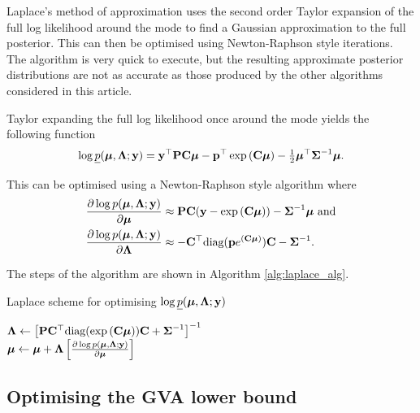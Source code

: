\documentclass{article}[12pt]
\begin{document}
Laplace's method of approximation uses the second order Taylor expansion of the full log likelihood around the
mode to find a Gaussian approximation to the full posterior. This can then be optimised using Newton-Raphson
style iterations. The algorithm is very quick to execute, but the resulting approximate posterior
distributions are not as accurate as those produced by the other algorithms considered in this article.


Taylor expanding the full log likelihood once around the mode yields the following function
\begin{align*}
\log \underline{p}({\boldsymbol \mu}, {\boldsymbol \Lambda}; {\bf y}) = {\bf y}^\top{\bf P}{\bf C}{\boldsymbol\mu} - {\bf p}^\top\exp \left ({\bf C} {\boldsymbol \mu} \right ) - {\tfrac{1}{2}} {\boldsymbol \mu}^\top {\boldsymbol\Sigma}^{-1} {\boldsymbol \mu}.
\end{align*}

This can be optimised using a Newton-Raphson style algorithm where
\begin{align*}
\frac{\partial \log p({\boldsymbol \mu}, {\boldsymbol \Lambda}; {\bf y})}{\partial {\boldsymbol\mu}} &\approx {\bf P} {\bf C} ({\bf y} - \exp{({\bf C}{\boldsymbol\mu})}) - {\boldsymbol \Sigma}^{-1} {\boldsymbol \mu} \text{ and} \\
\frac{\partial \log p({\boldsymbol \mu}, {\boldsymbol \Lambda}; {\bf y})}{\partial {\boldsymbol\Lambda}} &\approx - {\bf C}^\top \text{diag}({\bf p} e^{({\bf C} {\boldsymbol \mu})}) {\bf C} - {\boldsymbol \Sigma}^{-1}.
\end{align*}

The steps of the algorithm are shown in Algorithm \ref{alg:laplace_alg}.

\begin{algorithm}
\caption{Laplace scheme for optimising $\log \underline{p}({\boldsymbol \mu}, {\boldsymbol \Lambda}; {\bf y})$}
\label{alg:laplace_alg}
\begin{algorithmic}
\STATE ${\boldsymbol \Lambda} \leftarrow \left [{\bf P} {\bf C}^\top \text{diag}(\exp{({\bf C}{\boldsymbol\mu})}) {\bf C} + {\boldsymbol \Sigma}^{-1} \right ]^{-1}$ \\ [1ex] 
\STATE ${\boldsymbol \mu} \leftarrow {\boldsymbol\mu} + {\boldsymbol \Lambda} \left [ \frac{\partial \log p({\boldsymbol \mu}, {\boldsymbol \Lambda}; {\bf y})}{\partial {\boldsymbol\mu}} \right ]$ \\ [1ex]
\ENDWHILE
\end{algorithmic}
\end{algorithm}

\subsection{Optimising the GVA lower bound}
\end{document}
